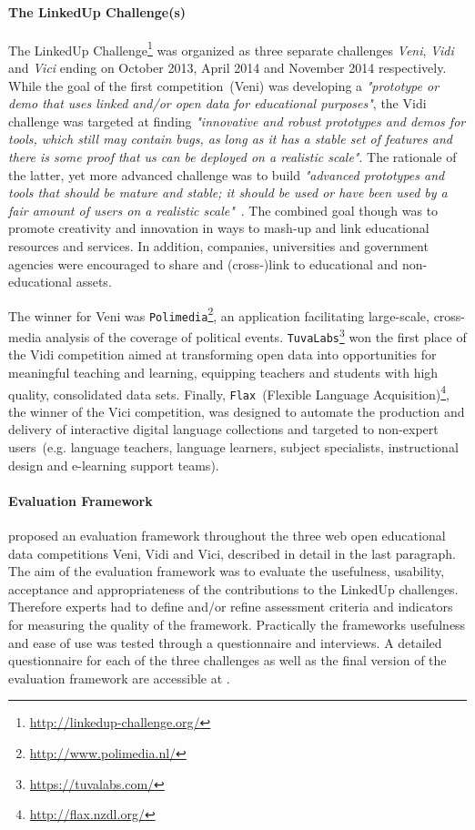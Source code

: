 \documentclass{article}
\begin{document}
\paragraph{The LinkedUp Challenge(s)}
The LinkedUp Challenge\footnote{\url{http://linkedup-challenge.org/}} was organized as three separate challenges \textit{Veni}, \textit{Vidi} and \textit{Vici} ending on October 2013, April 2014 and November 2014 respectively. While the goal of the first competition~(Veni) was developing a \textit{"prototype or demo that uses linked and/or open data for educational purposes"}, the Vidi challenge was targeted at finding \textit{"innovative and robust prototypes and demos for tools, which still may contain bugs, as long as it has a stable set of features and there is some proof that us can be deployed on a realistic scale"}. The rationale of the latter, yet more advanced challenge was to build \textit{"advanced prototypes and tools that should be mature and stable; it should be used or have been used by a fair amount of users on a realistic scale"}~\cite{url:linkedup_lnikedup_challenge_results}. 
The combined goal though was to promote creativity and innovation in ways to mash-up and link educational resources and services. In addition, companies, universities and government agencies were encouraged to share and (cross-)link to educational and non-educational assets. 

The winner for Veni was \texttt{Polimedia}\footnote{\url{http://www.polimedia.nl/}}, an application facilitating large-scale, cross-media analysis of the coverage of political events.
\texttt{TuvaLabs}\footnote{\url{https://tuvalabs.com/}} won the first place of the Vidi competition aimed at transforming open data into opportunities for meaningful teaching and learning, equipping teachers and students with high quality, consolidated data sets. Finally, \texttt{Flax}~(Flexible Language Acquisition)\footnote{\url{http://flax.nzdl.org/}},
the winner of the Vici competition, was designed to automate the production and delivery of interactive digital language collections and targeted to non-expert users~(e.g. language teachers, language learners, subject specialists, instructional design and e-learning support teams). 

\paragraph{Evaluation Framework}
\citet{url:linkedup_evaluation_framework} proposed an evaluation framework throughout the three web open educational data competitions Veni, Vidi and Vici, described in detail in the last paragraph. The aim of the evaluation framework was to evaluate the usefulness, usability, acceptance and appropriateness of the contributions to the LinkedUp challenges. Therefore experts had to define and/or refine assessment criteria and indicators for measuring the quality of the framework. Practically the frameworks usefulness and ease of use was tested through a questionnaire and interviews. A detailed questionnaire for each of the three challenges as well as the final version of the evaluation framework are accessible at \cite{url:linkedup_evaluation_framework}. 
\end{document}
